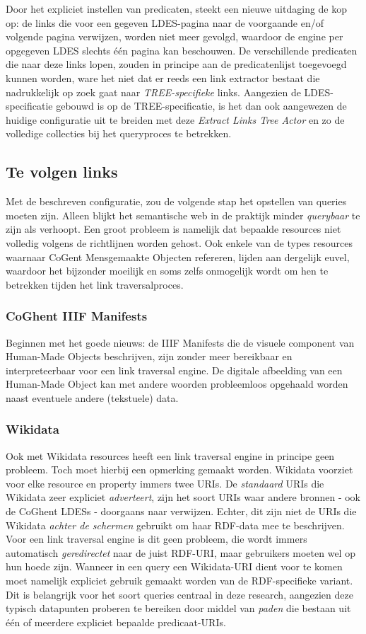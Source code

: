 \documentclass[conference]{IEEEtran}
\begin{document}
Door het expliciet instellen van predicaten, steekt een nieuwe uitdaging de kop op: de links die voor een gegeven LDES-pagina naar de voorgaande en/of volgende pagina verwijzen, worden niet meer gevolgd, waardoor de engine per opgegeven LDES slechts één pagina kan beschouwen. De verschillende predicaten die naar deze links lopen, zouden in principe aan de predicatenlijst toegevoegd kunnen worden, ware het niet dat er reeds een link extractor bestaat die nadrukkelijk op zoek gaat naar \textit{TREE-specifieke} links. Aangezien de LDES-specificatie gebouwd is op de TREE-specificatie, is het dan ook aangewezen de huidige configuratie uit te breiden met deze \textit{Extract Links Tree Actor} en zo de volledige collecties bij het queryproces te betrekken. \cite{colpaert2023tree}

\subsection{Te volgen links}
Met de beschreven configuratie, zou de volgende stap het opstellen van queries moeten zijn. Alleen blijkt het semantische web in de praktijk minder \textit{querybaar} te zijn als verhoopt. Een groot probleem is namelijk dat bepaalde resources niet volledig volgens de richtlijnen worden gehost. Ook enkele van de types resources waarnaar CoGent Mensgemaakte Objecten refereren, lijden aan dergelijk euvel, waardoor het bijzonder moeilijk en soms zelfs onmogelijk wordt om hen te betrekken tijden het link traversalproces.

\subsubsection{CoGhent IIIF Manifests}
Beginnen met het goede nieuws: de IIIF Manifests die de visuele component van Human-Made Objects beschrijven, zijn zonder meer bereikbaar en interpreteerbaar voor een link traversal engine. De digitale afbeelding van een Human-Made Object kan met andere woorden probleemloos opgehaald worden naast eventuele andere (tekstuele) data.

\subsubsection{Wikidata}
Ook met Wikidata resources heeft een link traversal engine in principe geen probleem. Toch moet hierbij een opmerking gemaakt worden. Wikidata voorziet voor elke resource en property immers twee URIs. De \textit{standaard} URIs die Wikidata zeer expliciet \textit{adverteert}, zijn het soort URIs waar andere bronnen - ook de CoGhent LDESs - doorgaans naar verwijzen. Echter, dit zijn niet de URIs die Wikidata \textit{achter de schermen} gebruikt om haar RDF-data mee te beschrijven. Voor een link traversal engine is dit geen probleem, die wordt immers automatisch \textit{geredirectet} naar de juist RDF-URI, maar gebruikers moeten wel op hun hoede zijn. Wanneer in een query een Wikidata-URI dient voor te komen moet namelijk expliciet gebruik gemaakt worden van de RDF-specifieke variant. Dit is belangrijk voor het soort queries centraal in deze research, aangezien deze typisch datapunten proberen te bereiken door middel van \textit{paden} die bestaan uit één of meerdere expliciet bepaalde predicaat-URIs.
\end{document}
